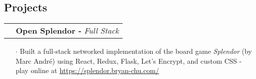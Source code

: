 \documentclass[a4paper, oneside, final]{scrartcl} %
\newcommand{\gray}{\rowcolor[gray]{.90}} %
\begin{document}
\begin{center}
  \vspace{-0.6cm}

  \section{Projects}
  \renewcommand{\arraystretch}{1.3}






  \vspace{-0.05cm}

  \begin{tabularx}{1.00\linewidth}{>{\raggedleft\scshape}p{0cm}X}
    \gray& \textbf{Open Splendor -} \textit{Full Stack}\\
  \end{tabularx}
  \begin{itemize}\itemsep-0.2cm
      \vspace{-0.1cm}
    \item[$\cdot$] Built a full-stack networked implementation of the board game \textit{Splendor} (by Marc André) using React, Redux, Flask, Let's Encrypt, and custom CSS - play online at \href{https://splendor.bryan-chu.com/}{https://splendor.bryan-chu.com/}\\
  \end{itemize}


\end{center}
\end{document}
